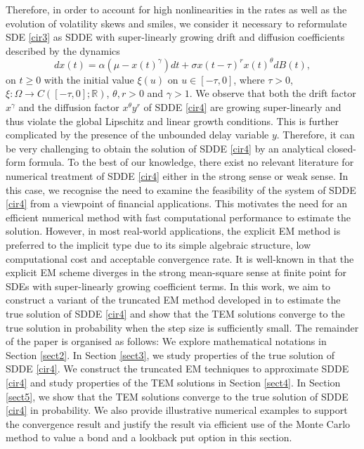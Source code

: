 \documentclass[11pt]{article}
\begin{document}
\par
Therefore, in order to account for high nonlinearities in the rates as well as the evolution of volatility skews and smiles, we consider it necessary to reformulate SDE \eqref{cir3} as SDDE with super-linearly growing drift and diffusion coefficients described by the dynamics
\begin{equation}\label{cir4}
dx(t)=\alpha(\mu-x(t)^{\gamma})dt+\sigma x(t-\tau)^{r}x(t)^{\theta}dB(t),
\end{equation}
on $t\ge 0$ with the initial value $\xi(u)$ on $u\in[-\tau,0]$, where $\tau>0$, $\xi:\Omega\rightarrow C([-\tau,0];\mathbb{R})$, $\theta, r>0$ and $\gamma>1$. We observe that both the drift factor $x^{\gamma}$  and the diffusion factor $x^{\theta}y^r$ of SDDE \eqref{cir4} are growing super-linearly and thus violate the global Lipschitz and linear growth conditions. This is further complicated by the presence of the unbounded delay variable $y$. Therefore, it can be very challenging to obtain the solution of SDDE \eqref{cir4} by an analytical closed-form formula. To the best of our knowledge, there exist no relevant literature for numerical treatment of SDDE \eqref{cir4} either in the strong sense or weak sense. In this case, we recognise the need to examine the feasibility of the system of SDDE \eqref{cir4} from  a viewpoint of financial applications. This motivates the need for an efficient numerical method with fast computational performance to estimate the solution. However, in most real-world applications, the explicit EM method is preferred to the implicit type due to its simple algebraic structure, low computational cost and acceptable convergence rate. It is well-known in \cite{weakEM} that the explicit EM scheme diverges in the strong mean-square sense at finite point for SDEs with super-linearly growing coefficient terms. In this work, we aim to construct a variant of the truncated EM method developed in \cite{mao3} to estimate the true solution of SDDE \eqref{cir4} and show that the TEM solutions converge to the true solution in probability when the step size is sufficiently small. The remainder of the paper is organised as follows: We explore mathematical notations in Section \ref{sect2}. In Section \ref{sect3}, we study properties of the true solution of SDDE \eqref{cir4}. We construct the truncated EM techniques to approximate SDDE \eqref{cir4} and study properties of the TEM solutions in Section \ref{sect4}. In Section \ref{sect5},  we show that the TEM solutions converge to the true solution of SDDE \eqref{cir4} in probability. We also provide illustrative numerical examples to support the convergence result and justify the result via efficient use of the Monte Carlo method to value a bond and a lookback put option in this section.
\end{document}
